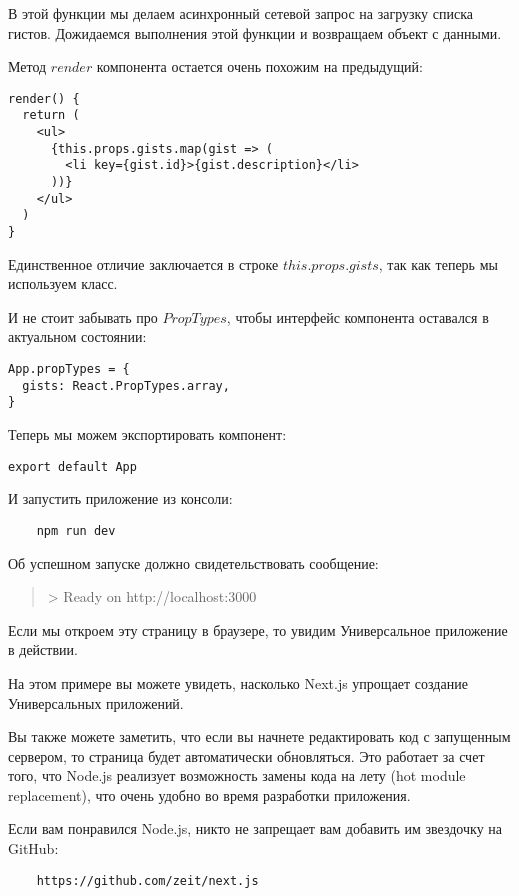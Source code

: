 В этой функции мы делаем асинхронный сетевой запрос на загрузку списка гистов. Дожидаемся выполнения этой функции и возвращаем объект с данными.

Метод $render$ компонента остается очень похожим на предыдущий:

\begin{lstlisting}
render() {
  return (
    <ul>
      {this.props.gists.map(gist => (
        <li key={gist.id}>{gist.description}</li>
      ))}
    </ul>
  )
}
\end{lstlisting}

Единственное отличие заключается в строке $this.props.gists$, так как теперь мы используем класс.

И не стоит забывать про $PropTypes$, чтобы интерфейс компонента оставался в актуальном состоянии:

\begin{lstlisting}
App.propTypes = {
  gists: React.PropTypes.array,
}
\end{lstlisting}

Теперь мы можем экспортировать компонент:

\begin{lstlisting}
export default App
\end{lstlisting}

И запустить приложение из консоли:

\begin{lstlisting}
	npm run dev
\end{lstlisting}

Об успешном запуске должно свидетельствовать сообщение:

\begin{quotation}
	> Ready on http://localhost:3000
\end{quotation}

Если мы откроем эту страницу в браузере, то увидим Универсальное приложение в действии.

На этом примере вы можете увидеть, насколько Next.js упрощает создание Универсальных приложений.

Вы также можете заметить, что если вы начнете редактировать код с запущенным сервером, то страница будет автоматически обновляться. Это работает за счет того, что Node.js реализует возможность замены кода на лету (hot module replacement), что очень удобно во время разработки приложения.

Если вам понравился Node.js, никто не запрещает вам добавить им звездочку на GitHub:

\begin{lstlisting}
	https://github.com/zeit/next.js
\end{lstlisting}


